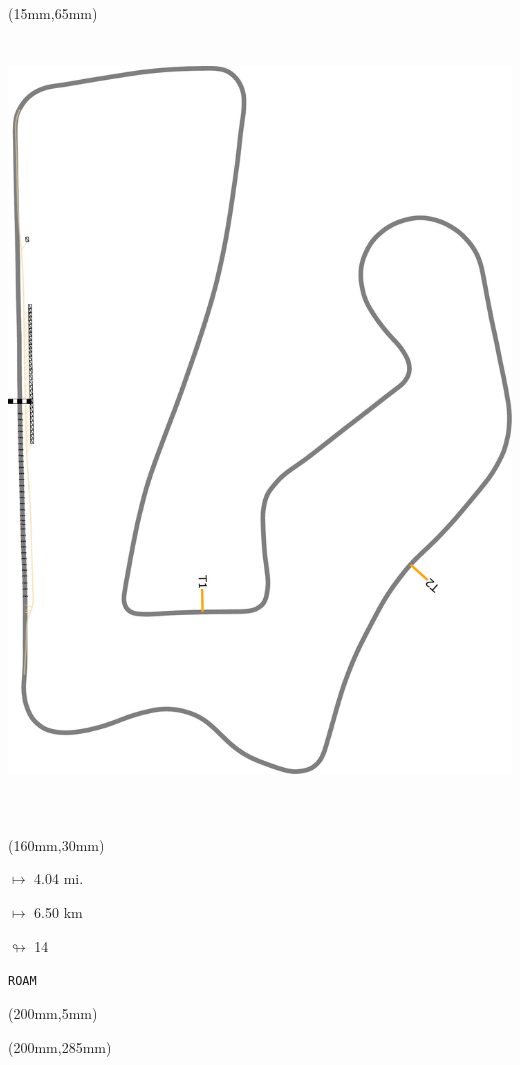 \begin{textblock*}{185mm}(15mm,65mm)%
\centering
\mbox{\includegraphics[width=185mm,height=210mm,keepaspectratio]{PT/ROAM.pdf}}
\end{textblock*}
\begin{textblock*}{40mm}(160mm,30mm)%
\Large
\par$\mapsto$ 4.04 mi.
\par$\mapsto$ 6.50 km
\par$\looparrowright$ 14
\par\hfill\tiny\tt ROAM\\
\end{textblock*}
\begin{textblock*}{20mm}(200mm,5mm)%
\fbox{\thepage}
\label{ROAM}
\end{textblock*}
\begin{textblock*}{20mm}(200mm,285mm)%
\fbox{\thepage}
\end{textblock*}

